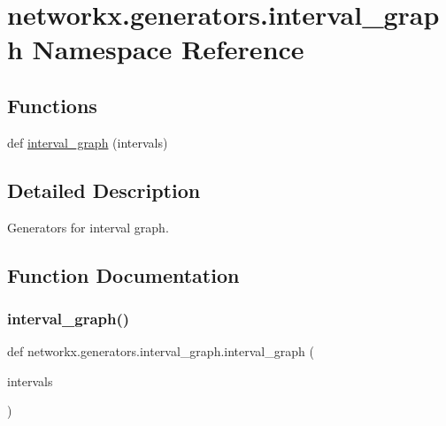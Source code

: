\hypertarget{namespacenetworkx_1_1generators_1_1interval__graph}{}\section{networkx.\+generators.\+interval\+\_\+graph Namespace Reference}
\label{namespacenetworkx_1_1generators_1_1interval__graph}
\subsection*{Functions}
\begin{DoxyCompactItemize}
\item 
def \hyperlink{namespacenetworkx_1_1generators_1_1interval__graph_a9a2cb8659fa8937b85acb73409304587}{interval\+\_\+graph} (intervals)
\end{DoxyCompactItemize}


\subsection{Detailed Description}
\begin{DoxyVerb}Generators for interval graph.
\end{DoxyVerb}
 

\subsection{Function Documentation}
\mbox{\label{namespacenetworkx_1_1generators_1_1interval__graph_a9a2cb8659fa8937b85acb73409304587}} 
\subsubsection{\texorpdfstring{interval\+\_\+graph()}{interval\_graph()}}
{\footnotesize\ttfamily def networkx.\+generators.\+interval\+\_\+graph.\+interval\+\_\+graph (\begin{DoxyParamCaption}\item[{}]{intervals }\end{DoxyParamCaption})}

